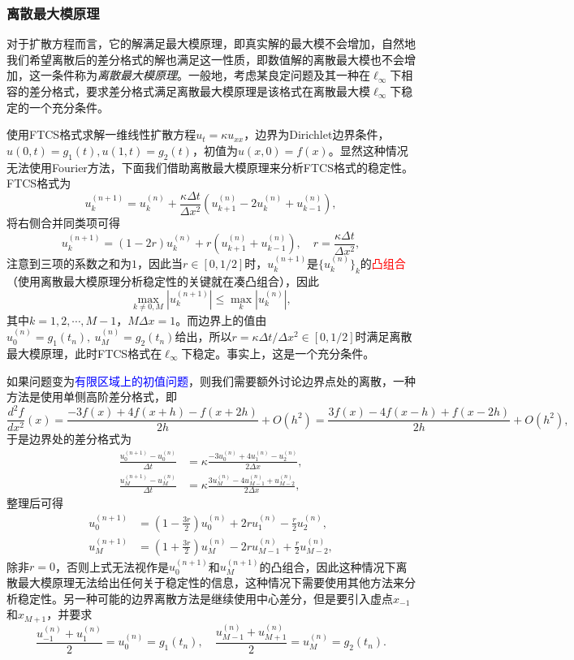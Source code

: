 \documentclass[a4paper,10pt]{ctexart}
\begin{document}
\subsubsection{离散最大模原理}
对于扩散方程而言，它的解满足最大模原理，即真实解的最大模不会增加，自然地我们希望离散后的差分格式的解也满足这一性质，即数值解的离散最大模也不会增加，这一条件称为\emph{离散最大模原理}。一般地，考虑某良定问题及其一种在$ \ell_\infty $下相容的差分格式，要求差分格式满足离散最大模原理是该格式在离散最大模$ \ell_\infty $下稳定的一个充分条件。

\begin{example}
    使用FTCS格式求解一维线性扩散方程$ u_t = \kappa u_{xx} $，边界为Dirichlet边界条件，$ u(0,t) = g_1(t),u(1,t) = g_2(t) $，初值为$ u(x,0) = f(x) $。显然这种情况无法使用Fourier方法，下面我们借助离散最大模原理来分析FTCS格式的稳定性。FTCS格式为
    \[
        u^{(n+1)}_k = u^{(n)}_k + \frac{\kappa \Delta t}{\Delta x^2} (u^{(n)}_{k+1} - 2u^{(n)}_k + u^{(n)}_{k-1}),
    \]
    将右侧合并同类项可得
    \[
        u^{(n+1)}_k = (1-2r)u^{(n)}_k + r(u^{(n)}_{k+1} + u^{(n)}_{k-1}), \quad r = \frac{\kappa \Delta t}{\Delta x^2},
    \]
    注意到三项的系数之和为$ 1 $，因此当$ r\in [0,1 / 2] $时，$ u^{(n+1)}_k $是$ \{u^{(n)}_k\}_k $的\textcolor{red}{凸组合}（使用离散最大模原理分析稳定性的关键就在凑凸组合），因此
    \[
        \max_{k\ne 0,M} |u^{(n+1)}_k| \leqslant \max_k |u^{(n)}_k|,
    \]
    其中$ k=1,2,\cdots ,M-1 $，$ M\Delta x = 1 $。而边界上的值由$ u^{(n)}_0 = g_1(t_n),\ u^{(n)}_M = g_2(t_n) $给出，所以$ r = \kappa \Delta t / \Delta x^2\in [0,1 / 2] $时满足离散最大模原理，此时FTCS格式在$ \ell_\infty $下稳定。事实上，这是一个充分条件。
    
    如果问题变为\textcolor{blue}{有限区域上的初值问题}，则我们需要额外讨论边界点处的离散，一种方法是使用单侧高阶差分格式，即
    \[
        \frac{d^2 f}{dx^2}(x) = \frac{-3f(x)+4f(x+h)-f(x+2h)}{2h} + O(h^2) = \frac{3f(x)-4f(x-h)+f(x-2h)}{2h} + O(h^2),
    \]
    于是边界处的差分格式为
    \[
        \begin{aligned}
            \frac{u^{(n+1)}_0 - u^{(n)}_0}{\Delta t} &= \kappa \frac{-3u^{(n)}_0 + 4u^{(n)}_1 - u^{(n)}_2}{2\Delta x},\\
            \frac{u^{(n+1)}_M - u^{(n)}_M}{\Delta t} &= \kappa \frac{3u^{(n)}_M - 4u^{(n)}_{M-1} + u^{(n)}_{M-2}}{2\Delta x},
        \end{aligned}
    \]
    整理后可得
    \[
        \begin{aligned}
            u^{(n+1)}_0 &= (1-\frac{3r}{2})u^{(n)}_0 +  2ru^{(n)}_1 - \frac{r}{2}u^{(n)}_2,\\
            u^{(n+1)}_M &= (1+\frac{3r}{2})u^{(n)}_M - 2ru^{(n)}_{M-1} + \frac{r}{2}u^{(n)}_{M-2},
        \end{aligned}
    \]
    除非$ r= 0 $，否则上式无法视作是$ u^{(n+1)}_0 $和$ u^{(n+1)}_M $的凸组合，因此这种情况下离散最大模原理无法给出任何关于稳定性的信息，这种情况下需要使用其他方法来分析稳定性。另一种可能的边界离散方法是继续使用中心差分，但是要引入虚点$ x_{-1} $和$ x_{M+1} $，并要求
    \[
        \frac{u^{(n)}_{-1} + u^{(n)}_{1}}{2} = u^{(n)}_0 = g_1(t_n),\quad \frac{u^{(n)}_{M-1} + u^{(n)}_{M+1}}{2} = u^{(n)}_M = g_2(t_n).
    \]
\end{example}
\end{document}

